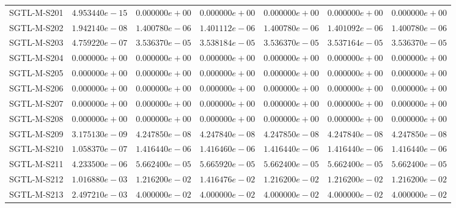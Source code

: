 \begin{longtable}{lrrrrrr}
SGTL-M-S201 & $4.953440e-15$ & $0.000000e+00$ & $0.000000e+00$ & $0.000000e+00$ & $0.000000e+00$ & $0.000000e+00$ \\
SGTL-M-S202 & $1.942140e-08$ & $1.400780e-06$ & $1.401112e-06$ & $1.400780e-06$ & $1.401092e-06$ & $1.400780e-06$ \\
SGTL-M-S203 & $4.759220e-07$ & $3.536370e-05$ & $3.538184e-05$ & $3.536370e-05$ & $3.537164e-05$ & $3.536370e-05$ \\
SGTL-M-S204 & $0.000000e+00$ & $0.000000e+00$ & $0.000000e+00$ & $0.000000e+00$ & $0.000000e+00$ & $0.000000e+00$ \\
SGTL-M-S205 & $0.000000e+00$ & $0.000000e+00$ & $0.000000e+00$ & $0.000000e+00$ & $0.000000e+00$ & $0.000000e+00$ \\
SGTL-M-S206 & $0.000000e+00$ & $0.000000e+00$ & $0.000000e+00$ & $0.000000e+00$ & $0.000000e+00$ & $0.000000e+00$ \\
SGTL-M-S207 & $0.000000e+00$ & $0.000000e+00$ & $0.000000e+00$ & $0.000000e+00$ & $0.000000e+00$ & $0.000000e+00$ \\
SGTL-M-S208 & $0.000000e+00$ & $0.000000e+00$ & $0.000000e+00$ & $0.000000e+00$ & $0.000000e+00$ & $0.000000e+00$ \\
SGTL-M-S209 & $3.175130e-09$ & $4.247850e-08$ & $4.247840e-08$ & $4.247850e-08$ & $4.247840e-08$ & $4.247850e-08$ \\
SGTL-M-S210 & $1.058370e-07$ & $1.416440e-06$ & $1.416460e-06$ & $1.416440e-06$ & $1.416440e-06$ & $1.416440e-06$ \\
SGTL-M-S211 & $4.233500e-06$ & $5.662400e-05$ & $5.665920e-05$ & $5.662400e-05$ & $5.662400e-05$ & $5.662400e-05$ \\
SGTL-M-S212 & $1.016880e-03$ & $1.216200e-02$ & $1.416476e-02$ & $1.216200e-02$ & $1.216200e-02$ & $1.216200e-02$ \\
SGTL-M-S213 & $2.497210e-03$ & $4.000000e-02$ & $4.000000e-02$ & $4.000000e-02$ & $4.000000e-02$ & $4.000000e-02$ \\
\end{longtable}
